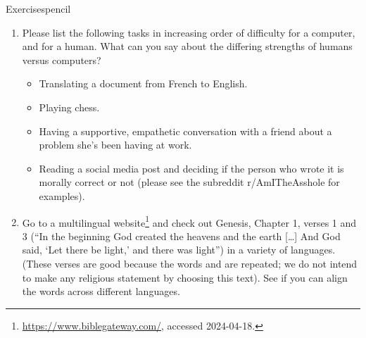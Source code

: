 \begin{tblsfilledsymbol}{Exercises}{pencil}
\begin{enumerate}
\begin{enumerate}
  \item Draw a Venn diagram showing how the English words
     and  overlap with the Mam words
    {[ntzʔica]} and {[witzin]}.

          
  \item You come across the text: , but it gives no indication of who is older.  If you
    had to translate this into Mam and were being forced to preserve
    this age ambiguity, how would you do it?
  \end{enumerate}

\item Please list the following tasks in increasing order of difficulty for a computer, and for a human.  What can you say about the differing strengths of humans versus computers?

\begin{itemize}

\item Translating a document from French to English.

\item Playing chess.

\item Having a supportive, empathetic conversation with a friend about a problem she's been having at work.

\item Reading a social media post and deciding if the person who wrote it is morally correct or not (please see the subreddit r/AmITheAsshole for examples).

\end{itemize} 

\item Go to a multilingual website\footnote{\url{https://www.biblegateway.com/}, accessed 2024-04-18.}  and check out Genesis, Chapter 1, verses 1 and 3 (``In the beginning God created the heavens and the earth [\ldots] And God said, `Let there be light,' and there was light'') in a variety of languages.  (These verses are good because the words  and  are repeated; we do not intend to make any religious statement by choosing this text).  See if you can align the words across different languages.

\end{enumerate}
\end{tblsfilledsymbol}


